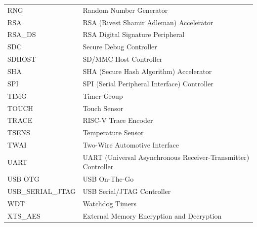 \begin{longtable}[c]{ R{3cm} p{12cm} }
RNG & Random Number Generator \\
RSA & RSA (Rivest Shamir Adleman) Accelerator \\
RSA\_DS & RSA Digital Signature Peripheral \\
SDC & Secure Debug Controller \\
SDHOST & SD/MMC Host Controller \\
SHA & SHA (Secure Hash Algorithm) Accelerator \\
SPI & SPI (Serial Peripheral Interface) Controller \\
TIMG & Timer Group \\
TOUCH & Touch Sensor \\
TRACE & RISC-V Trace Encoder \\
TSENS & Temperature Sensor \\
TWAI & Two-Wire Automotive Interface \\
UART & UART (Universal Asynchronous Receiver-Transmitter) Controller \\
USB OTG & USB On-The-Go \\
USB\_SERIAL\_JTAG & USB Serial/JTAG Controller \\
WDT & Watchdog Timers \\
XTS\_AES & External Memory Encryption and Decryption \\

\end{longtable}




